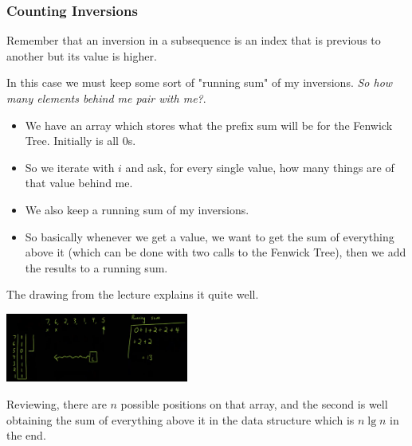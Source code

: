 \documentclass{IEEEtran}
\begin{document}
      \subsubsection{Counting Inversions}
        Remember that an inversion in a subsequence is an index that is previous to another but its value is higher.\par
        In this case we must keep some sort of "running sum" of my inversions. \textit{So how many elements behind me pair with me?}.
        \begin{itemize}
          \item We have an array which stores what the prefix sum will be for the Fenwick Tree. Initially is all 0s.
          \item So we iterate with  $i$ and ask, for every single value, how many things are of that value behind me.
          \item We also keep a running sum of my inversions.
          \item So basically whenever we get a value, we want to get the sum of everything above it (which can be done with two calls to the Fenwick Tree), then we add the results to a running sum.
        \end{itemize}
        \par The drawing from the lecture explains it quite well.
        \begin{center}
          \includegraphics[width = 0.45\textwidth]{ftExample.png}
        \end{center}
        \par Reviewing, there are $n$ possible positions on that array, and the second is well obtaining the sum of everything above it in the data structure which is $n\lg{n}$ in the end.
\end{document}
